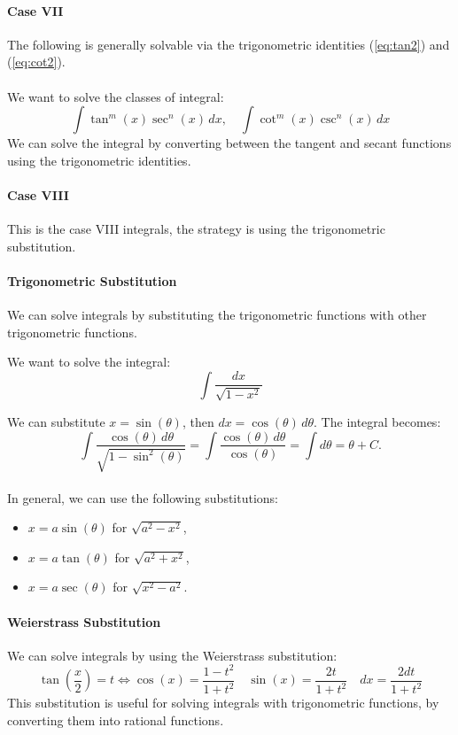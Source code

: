 \documentclass[11pt]{article}
\begin{document}
\paragraph{Case VII} The following is generally solvable via the trigonometric identities (\ref{eq:tan2}) and (\ref{eq:cot2}).
\paragraph{} We want to solve the classes of integral:
\begin{equation} \int \tan^m(x) \sec^n(x) \, dx, \quad \int \cot^m(x) \csc^n(x) \, dx \end{equation}
We can solve the integral by converting between the tangent and secant functions using the trigonometric identities.
\paragraph{Case VIII} This is the case VIII integrals, the strategy is using the trigonometric substitution.
\paragraph{Trigonometric Substitution} We can solve integrals by substituting the trigonometric functions with other trigonometric functions.
\begin{example}
We want to solve the integral:
$$ \int \frac{dx}{\sqrt{1 - x^2}} $$
\end{example}
We can substitute $x = \sin(\theta)$, then $dx = \cos(\theta) \, d\theta$. The integral becomes:
$$ \int \frac{\cos(\theta) \, d\theta}{\sqrt{1 - \sin^2(\theta)}} = \int \frac{\cos(\theta) \, d\theta}{\cos(\theta)} = \int d\theta = \theta + C. $$
\paragraph{} In general, we can use the following substitutions:
\begin{itemize}
    \item $x = a\sin(\theta)$ for $\sqrt{a^2 - x^2}$,
    \item $x = a\tan(\theta)$ for $\sqrt{a^2 + x^2}$,
    \item $x = a\sec(\theta)$ for $\sqrt{x^2 - a^2}$.
\end{itemize}
\paragraph{Weierstrass Substitution} We can solve integrals by using the Weierstrass substitution:
\begin{equation}
    \tan\left(\frac{x}{2}\right) = t \Leftrightarrow \cos(x) = \frac{1-t^2}{1+t^2} \quad \sin(x) = \frac{2t}{1+t^2} \quad dx = \frac{2dt}{1+t^2}
\end{equation}
This substitution is useful for solving integrals with trigonometric functions, by converting them into rational functions.
\end{document}
